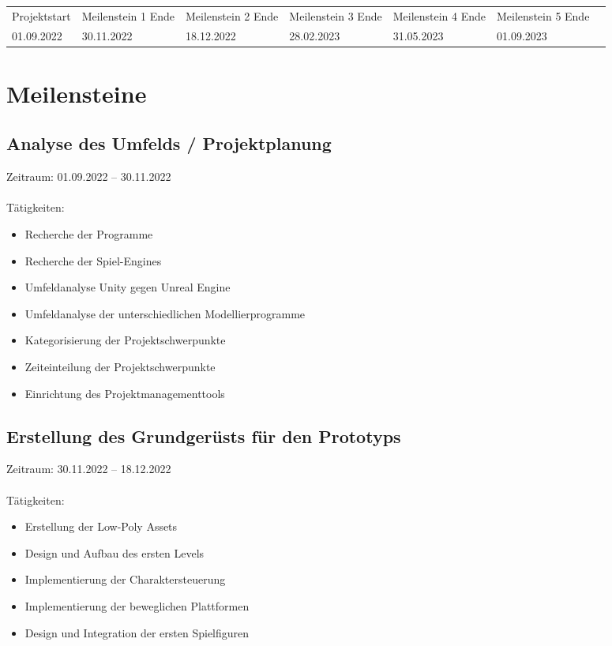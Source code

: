 \vspace{10pt}

\noindent
\begin{tabular}{|C{2.43cm}|C{2.43cm}|C{2.43cm}|C{2.43cm}|C{2.43cm}|C{2.43cm}|C{2.43cm}|}
    Projektstart & Meilenstein 1 Ende & Meilenstein 2 Ende & Meilenstein 3 Ende & Meilenstein 4 Ende & Meilenstein 5 Ende \\
    01.09.2022 & 30.11.2022 & 18.12.2022 & 28.02.2023 & 31.05.2023 & 01.09.2023 \\
\end{tabular}


\pagebreak

\section{Meilensteine}
\subsection{Analyse des Umfelds / Projektplanung}
Zeitraum: 01.09.2022 – 30.11.2022\\\\
Tätigkeiten:
\begin{itemize}
    \item Recherche der Programme
    \item Recherche der Spiel-Engines
    \item Umfeldanalyse Unity gegen Unreal Engine
    \item Umfeldanalyse der unterschiedlichen Modellierprogramme
    \item Kategorisierung der Projektschwerpunkte
    \item Zeiteinteilung der Projektschwerpunkte
    \item Einrichtung des Projektmanagementtools 
\end{itemize}

\subsection{Erstellung des Grundgerüsts für den Prototyps}
Zeitraum: 30.11.2022 – 18.12.2022\\\\
Tätigkeiten:
\begin{itemize}
    \item Erstellung der Low-Poly Assets
    \item Design und Aufbau des ersten Levels 
    \item Implementierung der Charaktersteuerung
    \item Implementierung der beweglichen Plattformen
    \item Design und Integration der ersten Spielfiguren
\end{itemize}
\pagebreak

